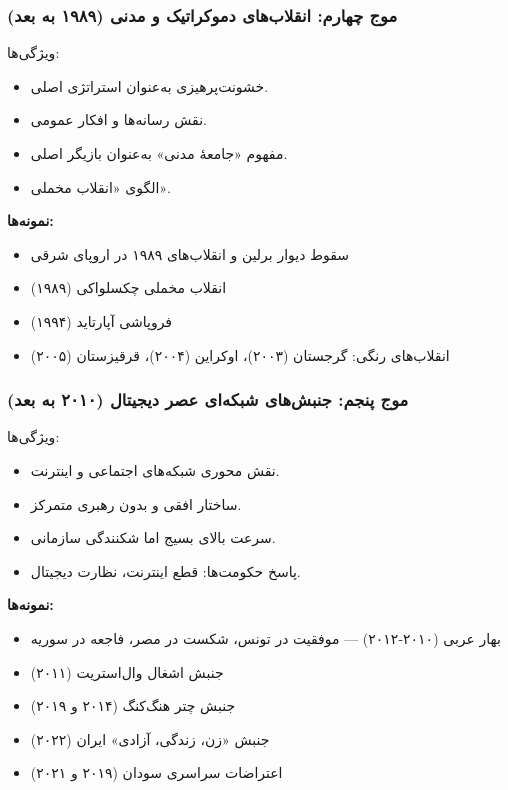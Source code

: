 \subsubsection*{موج چهارم: انقلاب‌های دموکراتیک و مدنی (۱۹۸۹ به بعد)}

ویژگی‌ها:
\begin{itemize}
\item خشونت‌پرهیزی به‌عنوان استراتژی اصلی.
\item نقش رسانه‌ها و افکار عمومی.
\item مفهوم «جامعهٔ مدنی» به‌عنوان بازیگر اصلی.
\item الگوی «انقلاب مخملی».
\end{itemize}

\textbf{نمونه‌ها:}
\begin{itemize}
\item سقوط دیوار برلین و انقلاب‌های ۱۹۸۹ در اروپای شرقی
\item انقلاب مخملی چکسلواکی (۱۹۸۹)
\item فروپاشی آپارتاید (۱۹۹۴)
\item انقلاب‌های رنگی: گرجستان (۲۰۰۳)، اوکراین (۲۰۰۴)، قرقیزستان (۲۰۰۵)
\end{itemize}

\subsubsection*{موج پنجم: جنبش‌های شبکه‌ای عصر دیجیتال (۲۰۱۰ به بعد)}

ویژگی‌ها:
\begin{itemize}
\item نقش محوری شبکه‌های اجتماعی و اینترنت.
\item ساختار افقی و بدون رهبری متمرکز.
\item سرعت بالای بسیج اما شکنندگی سازمانی.
\item پاسخ حکومت‌ها: قطع اینترنت، نظارت دیجیتال.
\end{itemize}

\textbf{نمونه‌ها:}
\begin{itemize}
\item بهار عربی (۲۰۱۰-۲۰۱۲) — موفقیت در تونس، شکست در مصر، فاجعه در سوریه
\item جنبش اشغال وال‌استریت (۲۰۱۱)
\item جنبش چتر هنگ‌کنگ (۲۰۱۴ و ۲۰۱۹)
\item جنبش «زن، زندگی، آزادی» ایران (۲۰۲۲)
\item اعتراضات سراسری سودان (۲۰۱۹ و ۲۰۲۱)
\end{itemize}

